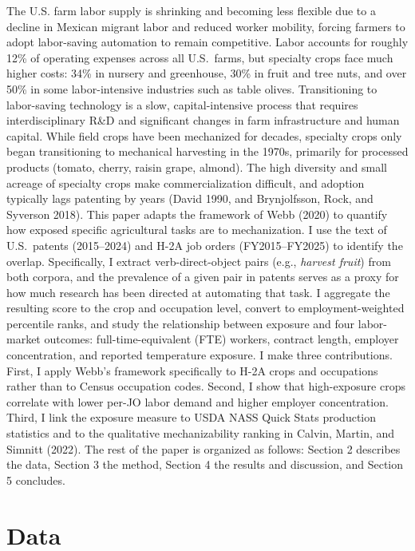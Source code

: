 \documentclass[11pt]{article}
\begin{document}
The U.S. farm labor supply is shrinking and becoming less flexible due to a decline in Mexican migrant labor and reduced worker mobility, forcing farmers to adopt labor-saving automation to remain competitive. Labor accounts for roughly 12\% of operating expenses across all U.S.\ farms, but specialty crops face much higher costs: 34\% in nursery and greenhouse, 30\% in fruit and tree nuts, and over 50\% in some labor-intensive industries such as table olives. Transitioning to labor-saving technology is a slow, capital-intensive process that requires interdisciplinary R\&D and significant changes in farm infrastructure and human capital. While field crops have been mechanized for decades, specialty crops only began transitioning to mechanical harvesting in the 1970s, primarily for processed products (tomato, cherry, raisin grape, almond). The high diversity and small acreage of specialty crops make commercialization difficult, and adoption typically lags patenting by years (David 1990, and Brynjolfsson, Rock, and Syverson 2018).
This paper adapts the framework of Webb (2020) to quantify how exposed specific agricultural tasks are to mechanization. I use the text of U.S.\ patents (2015--2024) and H-2A job orders (FY2015--FY2025) to identify the overlap. Specifically, I extract verb-direct-object pairs (e.g., \emph{harvest fruit}) from both corpora, and the prevalence of a given pair in patents serves as a proxy for how much research has been directed at automating that task. I aggregate the resulting score to the crop and occupation level, convert to employment-weighted percentile ranks, and study the relationship between exposure and four labor-market outcomes: full-time-equivalent (FTE) workers, contract length, employer concentration, and reported temperature exposure.
I make three contributions. First, I apply Webb's framework specifically to H-2A crops and occupations rather than to Census occupation codes. Second, I show that high-exposure crops correlate with lower per-JO labor demand and higher employer concentration. Third, I link the exposure measure to USDA NASS Quick Stats production statistics and to the qualitative mechanizability ranking in Calvin, Martin, and Simnitt (2022). The rest of the paper is organized as follows: Section 2 describes the data, Section 3 the method, Section 4 the results and discussion, and Section 5 concludes.

\section{Data}
\end{document}
